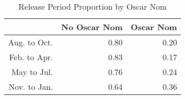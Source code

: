 \begin{table}[H]
\centering
\begin{tabular}{rrr}
  \hline
 & No Oscar Nom & Oscar Nom \\ 
  \hline
Aug. to Oct. & 0.80 & 0.20 \\ 
  Feb. to Apr. & 0.83 & 0.17 \\ 
  May to Jul. & 0.76 & 0.24 \\ 
  Nov. to Jan. & 0.64 & 0.36 \\ 
   \hline
\end{tabular}
\caption{Release Period Proportion by Oscar Nom} 
\label{tab:rpon}
\end{table}
